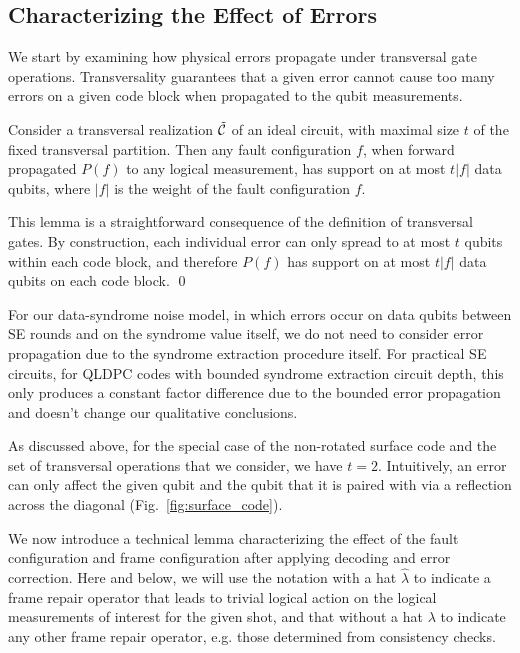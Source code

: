 \subsection{Characterizing the Effect of Errors}
\label{si_sec:physical_error}

We start by examining how physical errors propagate under transversal gate operations.
%
Transversality guarantees that a given error cannot cause too many errors on a given code block when propagated to the qubit measurements.

\begin{lemma}
\label{lemma:transversal}
Consider a transversal realization $\tilde{\mathcal{C}}$ of an ideal circuit, with maximal size $t$ of the fixed transversal partition.
%
Then any fault configuration $f$, when forward propagated $P(f)$ to any logical measurement, has support on at most $t|f|$ data qubits, where $|f|$ is the weight of the fault configuration $f$.
\end{lemma}

This lemma is a straightforward consequence of the definition of transversal gates.
%
By construction, each individual error can only spread to at most $t$ qubits within each code block, and therefore $P(f)$ has support on at most $t|f|$ data qubits on each code block.
\qed

For our data-syndrome noise model, in which errors occur on data qubits between SE rounds and on the syndrome value itself, we do not need to consider error propagation due to the syndrome extraction procedure itself.
%
For practical SE circuits, for QLDPC codes with bounded syndrome extraction circuit depth, this only produces a constant factor difference due to the bounded error propagation and doesn't change our qualitative conclusions.

As discussed above, for the special case of the non-rotated surface code and the set of transversal operations that we consider, we have $t=2$.
%
Intuitively, an error can only affect the given qubit and the qubit that it is paired with via a reflection across the diagonal (Fig.~\ref{fig:surface_code}).

We now introduce a technical lemma characterizing the effect of the fault configuration and frame configuration after applying decoding and error correction.
%
Here and below, we will use the notation with a hat $\hat{\lambda}$ to indicate a frame repair operator that leads to trivial logical action on the logical measurements of interest for the given shot, and that without a hat $\lambda$ to indicate any other frame repair operator, e.g. those determined from consistency checks.

